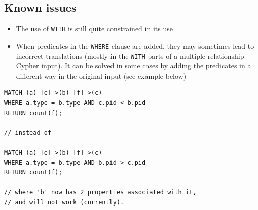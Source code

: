 \documentclass[letterpaper]{ltxdoc}
\begin{document}
\subsection{Known issues}
\begin{itemize}
\item The use of \texttt{WITH} is still quite constrained in its use
\item When predicates in the \texttt{WHERE} clause are added, they may sometimes lead to incorrect translations (mostly in the \texttt{WITH} parts of a multiple relationship Cypher input). It can be solved in some cases by adding the predicates in a different way in the original input (see example below)
\end{itemize}

\begin{lstlisting}[language = Cypher]
MATCH (a)-[e]->(b)-[f]->(c)
WHERE a.type = b.type AND c.pid < b.pid
RETURN count(f);

// instead of

MATCH (a)-[e]->(b)-[f]->(c)
WHERE a.type = b.type AND b.pid > c.pid
RETURN count(f);

// where 'b' now has 2 properties associated with it,
// and will not work (currently).
\end{lstlisting}
\end{document}
